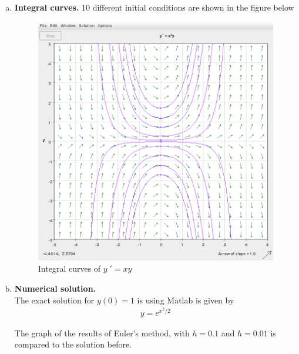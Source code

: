 \documentclass[a4paper,12pt]{article}
\begin{document}
\begin{enumerate}[I.]
\begin{enumerate}[a)]
    \item \textbf{Integral curves.} 10 different initial conditions are shown in the figure below
        \begin{figure}[H]
      \begin{center}
        \includegraphics[scale=.3]{12.png}
        \caption{Integral curves of $y\;' = xy$}
        \label{fig:2}
      \end{center}
    \end{figure}
    \item \textbf{Numerical solution.} \\
      The exact solution for $y(0) = 1$ is using Matlab is given by
      \begin{align*}
        \displaystyle y = e^{x^2/2}
      \end{align*}
      
      The graph of the results of Euler's method, with $h=0.1$ and $h=0.01$ is compared to the solution before. \\
      

\end{enumerate}
\end{enumerate}
\end{document}
